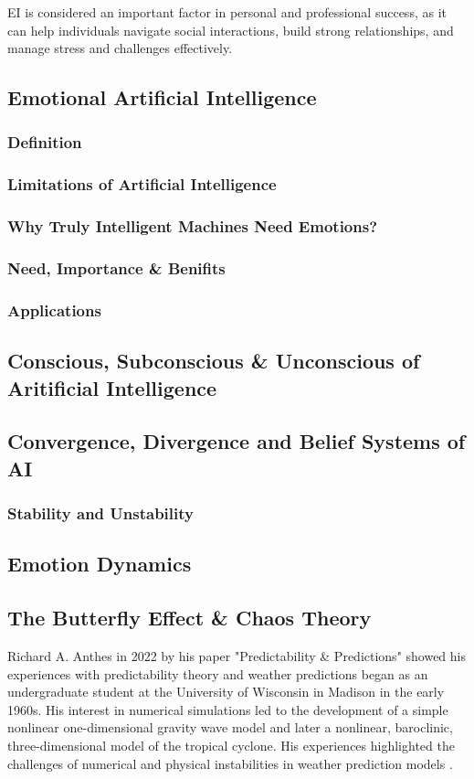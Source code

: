 EI is considered an important factor in personal and professional success, as it can help individuals navigate social interactions, build strong relationships, and manage stress and challenges effectively.
\subsection{Emotional Artificial Intelligence}

\subsubsection{Definition}
\subsubsection{Limitations of Artificial Intelligence}
\subsubsection{Why Truly Intelligent Machines Need Emotions?}
\subsubsection{Need, Importance \& Benifits}
\subsubsection{Applications}
\cite{ISSN-2456-2165}
\subsection{Conscious, Subconscious \& Unconscious of Aritificial Intelligence}
\subsection{Convergence, Divergence and Belief Systems of AI}
\subsubsection{Stability and Unstability}
\subsection{Emotion Dynamics}
\subsection{The Butterfly Effect \& Chaos Theory}
Richard A. Anthes in 2022 by his paper "Predictability \& Predictions" showed his experiences with predictability theory and weather predictions began as an undergraduate student at the University of Wisconsin in Madison in the early 1960s. His interest in numerical simulations led to the development of a simple nonlinear one-dimensional gravity wave model and later a nonlinear, baroclinic, three-dimensional model of the tropical cyclone. His experiences highlighted the challenges of numerical and physical instabilities in weather prediction models \cite{atmos13081292}. \cite{encyclopedia2030084}

